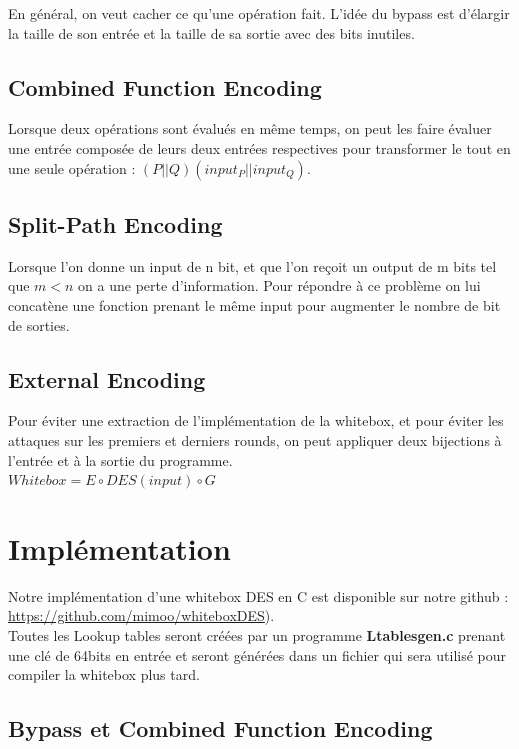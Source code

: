 \documentclass[a4paper,12pt]{article}
\begin{document}
En général, on veut cacher ce qu'une opération fait. L'idée du bypass est d'élargir la taille de son entrée et la taille de sa sortie avec des bits inutiles.


\subsection{Combined Function Encoding}

Lorsque deux opérations sont évalués en même temps, on peut les faire évaluer une entrée composée de leurs deux entrées respectives pour transformer le tout en une seule opération : $(P||Q)(input_P||input_Q)$.

\subsection{Split-Path Encoding}

Lorsque l'on donne un input de n bit, et que l'on reçoit un output de m bits tel que $m < n$ on a une perte d'information. Pour répondre à ce problème on lui concatène une fonction prenant le même input pour augmenter le nombre de bit de sorties.


\subsection{External Encoding}

Pour éviter une extraction de l'implémentation de la whitebox, et pour éviter les attaques sur les premiers et derniers rounds, on peut appliquer deux bijections à l'entrée et à la sortie du programme.\\

$Whitebox = E \circ DES(input) \circ G$

\newpage

\section{Implémentation}

Notre implémentation d'une whitebox DES en C est disponible sur notre github : \url{https://github.com/mimoo/whiteboxDES}).\\
Toutes les Lookup tables seront créées par un programme \textbf{Ltablesgen.c} prenant une clé de 64bits en entrée et seront générées dans un fichier qui sera utilisé pour compiler la whitebox plus tard.

\subsection{Bypass et Combined Function Encoding}
\end{document}
